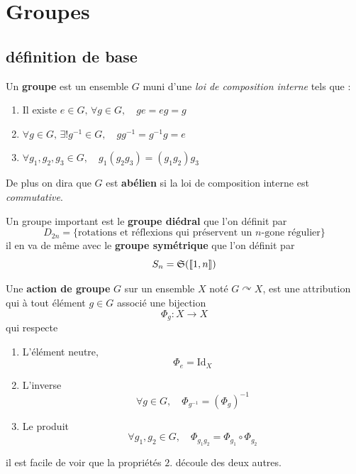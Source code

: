 \chapter{Groupes}
\minisommaire

\section{définition de base}
\begin{definition}[Groupe] \label{def: Groupe}
	Un \textbf{groupe} est un ensemble $G$ muni d'une \emph{loi de composition interne} tels que : 
	\begin{enumerate}
		\item Il existe $e \in G, \, \forall g \in G, \quad g e = e g = g$
		\item $\forall g \in G, \, \exists ! g^{-1} \in G, \quad g g^{-1} = g^{-1} g = e$
		\item $\forall g_1, g_2, g_3 \in G, \quad g_1(g_2 g_3) = (g_1 g_2) g_3$
	\end{enumerate}	
	De plus on dira que $G$ est \textbf{abélien} si la loi de composition interne est \emph{commutative}.
\end{definition}

\begin{exemple}
	Un groupe important est le \textbf{groupe diédral} que l'on définit par
	\[
	D_{2n} = \{ \text{rotations et réflexions qui préservent un $n$-gone régulier}\}
	\]
	il en va de même avec le \textbf{groupe symétrique} que l'on définit par
	\[
	S_n = \mathfrak S(\llbracket 1, n \rrbracket)
	\]
\end{exemple}

\begin{definition} \label{def: Action de groupe}
	Une \textbf{action de groupe} $G$ sur un ensemble $X$ noté $G \curvearrowright X$, est une attribution qui à tout élément $g \in G$ associé une bijection 
	\[
	\Phi_g : X \to X
	\]
	qui respecte
	\begin{enumerate}
		\item L'élément neutre,
		\[
		\Phi_e = \mathrm{Id}_X
		\]
		\item L'inverse
		\[
		\forall g \in G, \quad \Phi_{g^{-1}} = (\Phi_g)^{-1}
		\]
		\item Le produit
		\[
		\forall g_1, g_2 \in G, \quad \Phi_{g_1 g_2} = \Phi_{g_1} \circ \Phi_{g_2}
		\]
	\end{enumerate}
	il est facile de voir que la propriétés $2.$ découle des deux autres.
\end{definition}

